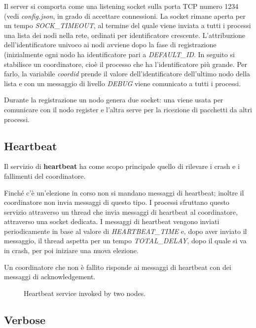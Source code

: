 \documentclass[conference]{IEEEtran}
\begin{document}
Il server si comporta come una listening socket sulla porta TCP numero 1234 (vedi \textit{config.json}, in grado di accettare connessioni.
La socket rimane aperta per un tempo \textit{SOCK\_TIMEOUT}, al termine del quale viene inviata a tutti i processi una lista dei nodi nella rete, ordinati per identificatore crescente.
L'attribuzione dell'identificatore univoco ai nodi avviene dopo la fase di registrazione (inizialmente ogni nodo ha identificatore pari a \textit{DEFAULT\_ID}.
In seguito si stabilisce un coordinatore, cioè il processo che ha l'identificatore più grande. Per farlo, la variabile \textit{coordid} prende il valore dell'identificatore dell'ultimo nodo della lista e con un messaggio di livello \textit{DEBUG} viene comunicato a tutti i processi.

Durante la registrazione un nodo genera due socket: una viene usata per comunicare con il nodo register e l'altra serve per la ricezione di pacchetti da altri processi.


\subsection{Heartbeat}

Il servizio di \textbf{heartbeat} ha come scopo principale quello di rilevare i crash e i fallimenti del coordinatore.

Finché c'è un'elezione in corso non si mandano messaggi di heartbeat; inoltre il coordinatore non invia messaggi di questo tipo.
I processi sfruttano questo servizio attraverso un thread che invia messaggi di heartbeat al coordinatore, attraverso una socket dedicata.
I messaggi di heartbeat vengono inviati periodicamente in base al valore di \textit{HEARTBEAT\_TIME} e, dopo aver inviato il messaggio, il thread aspetta per un tempo \textit{TOTAL\_DELAY}, dopo il quale si va in crash, per poi iniziare una nuova elezione.

Un coordinatore che non è fallito risponde ai messaggi di heartbeat con dei messaggi di acknowledgement.

\begin{figure}[htbp]
  \centering
  
  \caption{Heartbeat service invoked by two nodes.}
\end{figure}


\subsection{Verbose}
\end{document}
